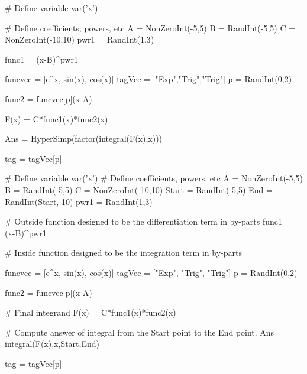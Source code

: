 


\begin{sagesilent}
# Define variable
var('x')

# Define coefficients, powers, etc
A = NonZeroInt(-5,5)
B = RandInt(-5,5)
C = NonZeroInt(-10,10)
pwr1 = RandInt(1,3)

func1 = (x-B)^pwr1

funcvec = [e^x, sin(x), cos(x)]
tagVec = ["Exp","Trig","Trig"]
p = RandInt(0,2)

func2 = funcvec[p](x-A)

F(x) = C*func1(x)*func2(x)

Ans = HyperSimp(factor(integral(F(x),x)))

tag = tagVec[p]
\end{sagesilent}



\begin{sagesilent}
# Define variable
var('x')
# Define coefficients, powers, etc
A = NonZeroInt(-5,5)
B = RandInt(-5,5)
C = NonZeroInt(-10,10)
Start = RandInt(-5,5)
End = RandInt(Start, 10)
pwr1 = RandInt(1,3)

# Outside function designed to be the differentiation term in by-parts
func1 = (x-B)^pwr1

# Inside function designed to be the integration term in by-parts

funcvec = [e^x, sin(x), cos(x)]
tagVec = ["Exp", "Trig", "Trig"]
p = RandInt(0,2)

func2 = funcvec[p](x-A)

# Final integrand
F(x) = C*func1(x)*func2(x)

# Compute answer of integral from the Start point to the End point.
Ans = integral(F(x),x,Start,End)

tag = tagVec[p]
\end{sagesilent}


